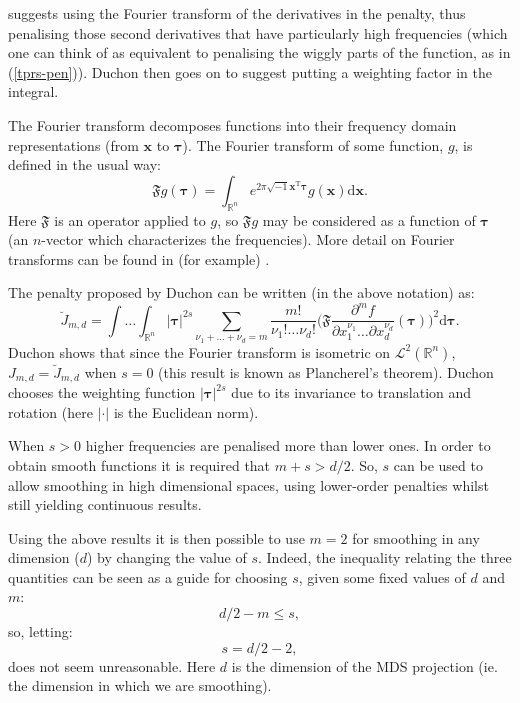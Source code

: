 \cite{duchon77} suggests using the Fourier transform of the derivatives in the penalty, thus penalising those second derivatives that have particularly high frequencies (which one can think of as equivalent to penalising the wiggly parts of the function, as in (\ref{tprs-pen})). Duchon then goes on to suggest putting a weighting factor in the integral. 

The Fourier transform decomposes functions into their frequency domain representations (from $\mathbf{x}$ to $\boldsymbol{\tau}$). The Fourier transform of some function, $g$, is defined in the usual way:
\begin{equation*}
\mathfrak{F} g(\boldsymbol{\tau}) = \int_{\mathbb{R}^n} e^{2 \pi \sqrt{-1} \mathbf{x}^\text{T} \boldsymbol{\tau}} g(\mathbf{x}) \text{d}\mathbf{x}.
\end{equation*}
Here $\mathfrak{F}$ is an operator applied to $g$, so $\mathfrak{F}g$ may be considered as a function of $\boldsymbol{\tau}$ (an $n$-vector which characterizes the frequencies). More detail on Fourier transforms can be found in (for example) \cite{bracewell}. 

The penalty proposed by Duchon can be written (in the above notation) as:
\begin{equation*}
\breve{J}_{m,d} = \int \ldots \int_{\mathbb{R}^n} \lvert \boldsymbol{\tau} \rvert^{2s} \sum_{\nu_1 + \dots + \nu_d=m} \frac{m!}{\nu_1! \dots \nu_d!}\Big( \mathfrak{F} \frac{\partial^m f}{\partial x_1^{\nu_1} \ldots  \partial x_d^{\nu_d}}(\boldsymbol{\tau}) \Big)^2 \text{d} \boldsymbol{\tau}.
\end{equation*}
Duchon shows that since the Fourier transform is isometric on $\mathcal{L}^2(\mathbb{R}^n)$, $J_{m,d} = \breve{J}_{m,d}$ when $s=0$ (this result is known as Plancherel's theorem). Duchon chooses the weighting function $\lvert \boldsymbol{\tau} \rvert^{2s}$ due to its invariance to translation and rotation (here $\lvert \cdot \rvert$ is the Euclidean norm).

When $s>0$ higher frequencies are penalised more than lower ones. In order to obtain smooth functions it is required that $m+s>d/2$. So, $s$ can be used to allow smoothing in high dimensional spaces, using lower-order penalties whilst still yielding continuous results.

Using the above results it is then possible to use $m=2$ for smoothing in any dimension ($d$) by changing the value of $s$. Indeed, the inequality relating the three quantities can be seen as a guide for choosing $s$, given some fixed values of $d$ and $m$:
\begin{equation*}
d/2 -m \leq s,
\end{equation*}
so, letting:
\begin{equation}
s=d/2-2,
\label{duchon-s}
\end{equation}
does not seem unreasonable. Here $d$ is the dimension of the MDS projection (ie. the dimension in which we are smoothing). 

